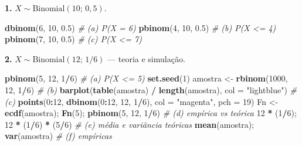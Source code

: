 \documentclass[
  portuguese,
  11pt,
  openany]{book}
\newenvironment{Shaded}{\begin{snugshade}}{\end{snugshade}}
\newcommand{\AttributeTok}[1]{\textcolor[rgb]{0.13,0.29,0.53}{#1}}
\newcommand{\CommentTok}[1]{\textcolor[rgb]{0.56,0.35,0.01}{\textit{#1}}}
\newcommand{\DecValTok}[1]{\textcolor[rgb]{0.00,0.00,0.81}{#1}}
\newcommand{\FloatTok}[1]{\textcolor[rgb]{0.00,0.00,0.81}{#1}}
\newcommand{\FunctionTok}[1]{\textcolor[rgb]{0.13,0.29,0.53}{\textbf{#1}}}
\newcommand{\NormalTok}[1]{#1}
\newcommand{\OtherTok}[1]{\textcolor[rgb]{0.56,0.35,0.01}{#1}}
\newcommand{\SpecialCharTok}[1]{\textcolor[rgb]{0.81,0.36,0.00}{\textbf{#1}}}
\newcommand{\StringTok}[1]{\textcolor[rgb]{0.31,0.60,0.02}{#1}}
\begin{document}
\textbf{1.} \(X \sim \text{Binomial}(10;\,0{,}5)\).

\begin{Shaded}
\begin{Highlighting}[]
\FunctionTok{dbinom}\NormalTok{(}\DecValTok{6}\NormalTok{, }\DecValTok{10}\NormalTok{, }\FloatTok{0.5}\NormalTok{)          }\CommentTok{\# (a) P(X = 6)}
\FunctionTok{pbinom}\NormalTok{(}\DecValTok{4}\NormalTok{, }\DecValTok{10}\NormalTok{, }\FloatTok{0.5}\NormalTok{)          }\CommentTok{\# (b) P(X \textless{}= 4)}
\FunctionTok{pbinom}\NormalTok{(}\DecValTok{7}\NormalTok{, }\DecValTok{10}\NormalTok{, }\FloatTok{0.5}\NormalTok{)          }\CommentTok{\# (c) P(X \textless{}= 7)}
\end{Highlighting}
\end{Shaded}

\textbf{2.} \(X \sim \text{Binomial}(12;\,1/6)\) --- teoria e simulação.

\begin{Shaded}
\begin{Highlighting}[]
\FunctionTok{pbinom}\NormalTok{(}\DecValTok{5}\NormalTok{, }\DecValTok{12}\NormalTok{, }\DecValTok{1}\SpecialCharTok{/}\DecValTok{6}\NormalTok{)                        }\CommentTok{\# (a) P(X \textless{}= 5)}
\FunctionTok{set.seed}\NormalTok{(}\DecValTok{1}\NormalTok{)}
\NormalTok{amostra }\OtherTok{\textless{}{-}} \FunctionTok{rbinom}\NormalTok{(}\DecValTok{1000}\NormalTok{, }\DecValTok{12}\NormalTok{, }\DecValTok{1}\SpecialCharTok{/}\DecValTok{6}\NormalTok{)          }\CommentTok{\# (b)}
\FunctionTok{barplot}\NormalTok{(}\FunctionTok{table}\NormalTok{(amostra) }\SpecialCharTok{/} \FunctionTok{length}\NormalTok{(amostra), }\AttributeTok{col =} \StringTok{"lightblue"}\NormalTok{)  }\CommentTok{\# (c)}
\FunctionTok{points}\NormalTok{(}\DecValTok{0}\SpecialCharTok{:}\DecValTok{12}\NormalTok{, }\FunctionTok{dbinom}\NormalTok{(}\DecValTok{0}\SpecialCharTok{:}\DecValTok{12}\NormalTok{, }\DecValTok{12}\NormalTok{, }\DecValTok{1}\SpecialCharTok{/}\DecValTok{6}\NormalTok{), }\AttributeTok{col =} \StringTok{"magenta"}\NormalTok{, }\AttributeTok{pch =} \DecValTok{19}\NormalTok{)}
\NormalTok{Fn }\OtherTok{\textless{}{-}} \FunctionTok{ecdf}\NormalTok{(amostra); }\FunctionTok{Fn}\NormalTok{(}\DecValTok{5}\NormalTok{); }\FunctionTok{pbinom}\NormalTok{(}\DecValTok{5}\NormalTok{, }\DecValTok{12}\NormalTok{, }\DecValTok{1}\SpecialCharTok{/}\DecValTok{6}\NormalTok{)   }\CommentTok{\# (d) empírica vs teórica}
\DecValTok{12} \SpecialCharTok{*}\NormalTok{ (}\DecValTok{1}\SpecialCharTok{/}\DecValTok{6}\NormalTok{); }\DecValTok{12} \SpecialCharTok{*}\NormalTok{ (}\DecValTok{1}\SpecialCharTok{/}\DecValTok{6}\NormalTok{) }\SpecialCharTok{*}\NormalTok{ (}\DecValTok{5}\SpecialCharTok{/}\DecValTok{6}\NormalTok{)            }\CommentTok{\# (e) média e variância teóricas}
\FunctionTok{mean}\NormalTok{(amostra); }\FunctionTok{var}\NormalTok{(amostra)               }\CommentTok{\# (f) empíricas}
\end{Highlighting}
\end{Shaded}
\end{document}

